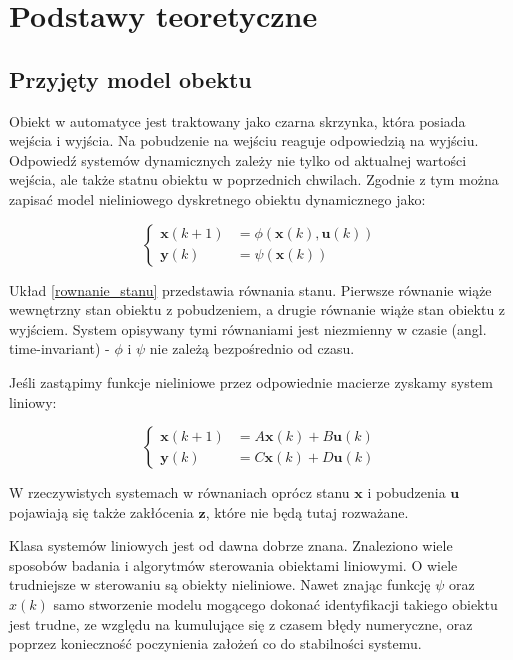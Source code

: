 \documentclass{article}
\newcommand{\bb}{\textbf}
\begin{document}
\section{Podstawy teoretyczne}

\subsection{Przyjęty model obektu}

Obiekt w automatyce jest traktowany jako czarna skrzynka, która posiada wejścia i wyjścia. Na pobudzenie na wejściu reaguje odpowiedzią na wyjściu. Odpowiedź systemów dynamicznych zależy nie tylko od aktualnej wartości wejścia, ale także statnu obiektu w poprzednich chwilach. Zgodnie z tym można zapisać model nieliniowego dyskretnego obiektu dynamicznego jako:

\begin{equation}
\left\{
\begin{array}{ll}
	\bb{x}(k+1) &= \phi (\bb{x}(k), \bb{u}(k)) \\
	\bb{y}(k)   &= \psi (\bb{x}(k))
\end{array} \right.
\label{rownanie_stanu}
\end{equation}

Układ \ref{rownanie_stanu} przedstawia równania stanu. Pierwsze równanie wiąże wewnętrzny stan obiektu z pobudzeniem, a drugie równanie wiąże stan obiektu z wyjściem. System opisywany tymi równaniami jest niezmienny w czasie (angl. time-invariant) - $\phi$ i $\psi$ nie zależą bezpośrednio od czasu.

Jeśli zastąpimy funkcje nieliniowe przez odpowiednie macierze zyskamy system liniowy:

\begin{equation}
\left\{
\begin{array}{ll}
	\bb{x}(k+1) &= A\bb{x}(k) + B\bb{u}(k) \\
	\bb{y}(k)   &= C\bb{x}(k) + D\bb{u}(k)
\end{array} \right.
\end{equation}

W rzeczywistych systemach w równaniach oprócz stanu $\bb{x}$ i pobudzenia $\bb{u}$ pojawiają się także zakłócenia $\bb{z}$, które nie będą tutaj rozważane.

Klasa systemów liniowych jest od dawna dobrze znana. Znaleziono wiele sposobów badania i algorytmów sterowania obiektami liniowymi. O wiele trudniejsze w sterowaniu są obiekty nieliniowe. Nawet znając funkcję $\psi$ oraz $x(k)$ samo stworzenie modelu mogącego dokonać identyfikacji takiego obiektu jest trudne, ze względu na kumulujące się z czasem błędy numeryczne, oraz poprzez konieczność poczynienia założeń co do stabilności systemu.
\end{document}
